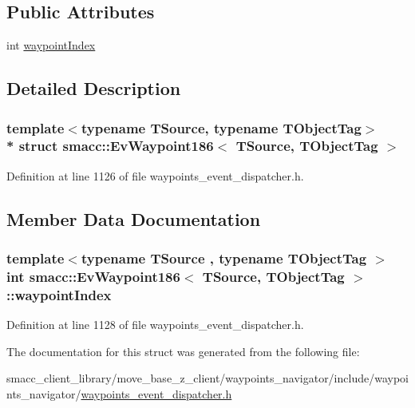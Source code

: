 \subsection*{Public Attributes}
\begin{DoxyCompactItemize}
\item 
int \hyperlink{structsmacc_1_1EvWaypoint186_aacadcb2c9097d1456de0a4595ef4a357}{waypoint\+Index}
\end{DoxyCompactItemize}


\subsection{Detailed Description}
\subsubsection*{template$<$typename T\+Source, typename T\+Object\+Tag$>$\\*
struct smacc\+::\+Ev\+Waypoint186$<$ T\+Source, T\+Object\+Tag $>$}



Definition at line 1126 of file waypoints\+\_\+event\+\_\+dispatcher.\+h.



\subsection{Member Data Documentation}
\subsubsection[{\texorpdfstring{waypoint\+Index}{waypointIndex}}]{\setlength{\rightskip}{0pt plus 5cm}template$<$typename T\+Source , typename T\+Object\+Tag $>$ int {\bf smacc\+::\+Ev\+Waypoint186}$<$ T\+Source, T\+Object\+Tag $>$\+::waypoint\+Index}\hypertarget{structsmacc_1_1EvWaypoint186_aacadcb2c9097d1456de0a4595ef4a357}{}\label{structsmacc_1_1EvWaypoint186_aacadcb2c9097d1456de0a4595ef4a357}


Definition at line 1128 of file waypoints\+\_\+event\+\_\+dispatcher.\+h.



The documentation for this struct was generated from the following file\+:\begin{DoxyCompactItemize}
\item 
smacc\+\_\+client\+\_\+library/move\+\_\+base\+\_\+z\+\_\+client/waypoints\+\_\+navigator/include/waypoints\+\_\+navigator/\hyperlink{waypoints__event__dispatcher_8h}{waypoints\+\_\+event\+\_\+dispatcher.\+h}\end{DoxyCompactItemize}
